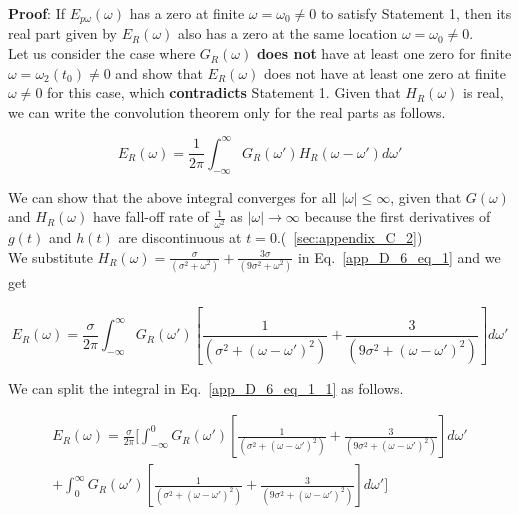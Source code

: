 \documentclass[11pt]{elsarticle}
\begin{document}
\textbf{Proof}: If $E_{p\omega}(\omega)$ has a zero at finite $\omega = \omega_{0} \neq 0$ to satisfy Statement 1, then its real part given by $E_{R}(\omega)$ also has a zero at the same location $\omega = \omega_{0} \neq 0$.\\

Let us consider the case where $G_{R}(\omega)$ \textbf{does not} have at least one zero for finite $\omega = \omega_{2}(t_0)  \neq 0$ and show that $E_{R}(\omega)$ does not have at least one zero at finite $\omega \neq 0$ for this case, which \textbf{contradicts} Statement 1.  Given that $H_R(\omega)$ is real, we can write the convolution theorem only for the real parts as follows.
 
\begin{equation} \label{app_D_6_eq_1}   
E_{R}(\omega) = \frac{1}{2 \pi}  \int_{-\infty}^{\infty} G_R(\omega') H_R(\omega - \omega') d\omega' 
\end{equation}

We can show that the above integral converges for all $|\omega| \leq \infty$, given that  $G(\omega)$ and $H_R(\omega)$ have fall-off rate of $\frac{1}{\omega^2}$ as $|\omega| \to \infty$ because the first derivatives of $g(t)$ and $h(t)$ are discontinuous at $t=0$.(~\ref{sec:appendix_C_2})\\




We substitute $H_R(\omega) = \frac{\sigma}{(\sigma^{2} + \omega^{2})} + \frac{3 \sigma}{(9 \sigma^{2} + \omega^{2})}$ in Eq.~\ref{app_D_6_eq_1} and we get

\begin{equation} \label{app_D_6_eq_1_1}   
E_{R}(\omega) = \frac{\sigma}{2 \pi}  \int_{-\infty}^{\infty} G_R(\omega') [ \frac{1}{(\sigma^{2} + (\omega - \omega')^{2})} + \frac{3}{(9\sigma^{2} + (\omega - \omega')^{2})} ] d\omega'
\end{equation}

We can split the integral in Eq.~\ref{app_D_6_eq_1_1} as follows.

\begin{eqnarray*} \label{app_D_6_eq_1_2}   
E_{R}(\omega)  = \frac{\sigma}{ 2\pi}  [ \int_{-\infty}^{0} G_R(\omega') [ \frac{1}{(\sigma^{2} + (\omega - \omega')^{2})} + \frac{3}{(9\sigma^{2} + (\omega - \omega')^{2})} ] d\omega'\\ + \int_{0}^{\infty} G_R(\omega')[ \frac{1}{(\sigma^{2} + (\omega - \omega')^{2})} + \frac{3}{(9\sigma^{2} + (\omega - \omega')^{2})} ] d\omega' ]
\end{eqnarray*} 
\begin{equation} \end{equation}
\end{document}
